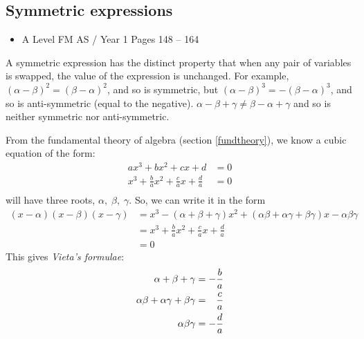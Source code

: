 \documentclass[11pt, a4paper]{article}
\begin{document}
\subsection{Symmetric expressions}
\begin{itemize}
\item A Level FM AS / Year 1 \hspace{1cm} Pages 148 -- 164
\end{itemize} \par
A symmetric expression has the distinct property that when any pair of variables is swapped, the value of the expression is unchanged. For example, $(\alpha-\beta)^{2}=(\beta-\alpha)^{2}$, and so is symmetric, but $(\alpha-\beta)^{3}=-(\beta-\alpha)^{3}$, and so is anti-symmetric (equal to the negative). $\alpha-\beta+\gamma\neq\beta-\alpha+\gamma$ and so is neither symmetric nor anti-symmetric. \newline \par
From the fundamental theory of algebra (section \ref{fundtheory}), we know a cubic equation of the form:
\begin{align*}
ax^{3}+bx^{2}+cx+d&=0 \\
x^{3}+\frac{b}{a}x^{2}+\frac{c}{a}x+\frac{d}{a}&=0\\
\end{align*}
will have three roots, $\alpha,\; \beta,\;\gamma$. So, we can write it in the form
\small
\begin{align*}
(x-\alpha)(x-\beta)(x-\gamma)&=x^{3}-(\alpha+\beta+\gamma)x^{2}+(\alpha\beta+\alpha\gamma+\beta\gamma)x-\alpha\beta\gamma \\
&=x^{3}+\frac{b}{a}x^{2}+\frac{c}{a}x+\frac{d}{a}\\
&=0
\end{align*}
\normalsize
This gives \emph{Vieta's formulae}:
\begin{align*}
\alpha+\beta+\gamma&= -\frac{b}{a}\\
\alpha\beta+\alpha\gamma+\beta\gamma&= \textcolor{white}{-}\frac{c}{a}\\
\alpha\beta\gamma&= -\frac{d}{a}\\
\end{align*}

\newpage
\end{document}
